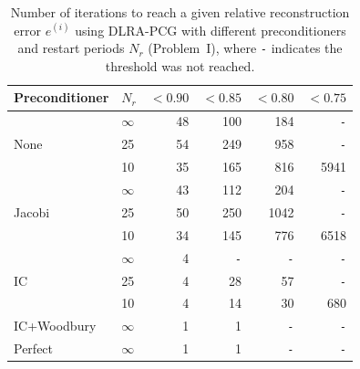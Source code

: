 \begin{table}[!ht]
\centering
\begin{tabular}{llrrrr}
\hline
Preconditioner & $N_r$ & $< 0.90$ & $< 0.85$ & $< 0.80$ & $< 0.75$ \\
\hline
\multirow{3}{*}{None}  
& $\infty$ & 48 & 100 & 184 & \texttt{-} \\
& 25 & 54 & 249 & 958 & \texttt{-} \\
& 10 & 35 & 165 & 816 & 5941 \\
\hline
\multirow{3}{*}{Jacobi}
& $\infty$ & 43 & 112 & 204 & \texttt{-} \\
& 25 & 50 & 250 & 1042 & \texttt{-} \\
& 10 & 34 & 145 & 776 & 6518 \\
\hline
\multirow{3}{*}{IC}
& $\infty$ & 4 & \texttt{-} & \texttt{-} & \texttt{-} \\
& 25 & 4 & 28 & 57 & \texttt{-} \\
& 10 & 4 & 14 & 30 & 680 \\
\hline
IC+Woodbury & $\infty$ & 1 & 1 & \texttt{-} & \texttt{-} \\
Perfect     & $\infty$ & 1 & 1 & \texttt{-} & \texttt{-} \\
\hline
\end{tabular}
\caption{Number of iterations to reach a given relative reconstruction error $e^{(i)}$ using DLRA-PCG with different preconditioners and restart periods $N_r$ (Problem~I), where \texttt{-} indicates the threshold was not reached.}
\label{tab:convergence_iterations_precond}
\end{table}
